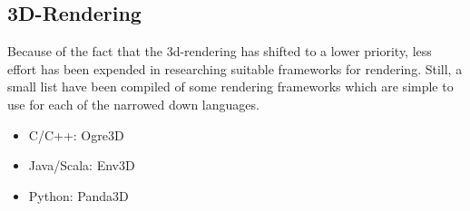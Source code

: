 \subsection{3D-Rendering}
Because of the fact that the 3d-rendering has shifted to a lower priority, less effort has been expended in researching suitable frameworks for rendering. Still, a small list have been compiled of some rendering frameworks which are simple to use for each of the narrowed down languages.
\begin{itemize}
	\item C/C++: Ogre3D \cite{web:ogre3d}
	\item Java/Scala: Env3D \cite{web:env3d}
	\item Python: Panda3D \cite{web:panda3d}
\end{itemize}
	